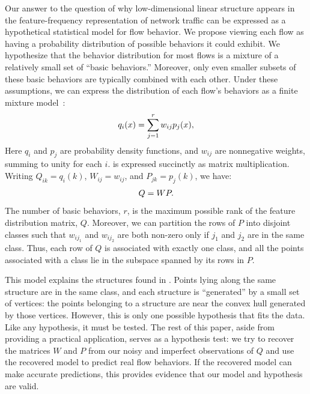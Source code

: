 \documentclass[conference]{IEEEtran}
\begin{document}
Our answer to the question of why low-dimensional linear structure appears in the feature-frequency representation of network traffic can be expressed as a hypothetical statistical model for flow behavior.
We propose viewing each flow as having a probability distribution of possible behaviors it could exhibit.
We hypothesize that the behavior distribution for most flows is a mixture of a relatively small set of ``basic behaviors.''
Moreover, only even smaller subsets of these basic behaviors are typically combined with each other.
Under these assumptions, we can express the distribution of each flow's behaviors as a finite mixture model~\cite{McLachlan00}:
\begin{align}\eqn{mixture-model}
  q_i(x) = \sum_{j=1}^r w_{ij} p_j(x),
\end{align}
Here $q_i$ and $p_j$ are probability density functions, and $w_{ij}$ are nonnegative weights, summing to unity for each $i$.
 is expressed succinctly as matrix multiplication.
Writing $Q_{ik} = q_i(k)$, $W_{ij} = w_{ij}$, and $P_{jk} = p_j(k)$, we have:
\begin{align}\eqn{mixture-model-matrix}
  Q = WP.
\end{align}
The number of basic behaviors, $r$, is the maximum possible rank of the feature distribution matrix, $Q$.
Moreover, we can partition the rows of $P$ into disjoint classes such that $w_{ij_1}$ and $w_{ij_2}$ are both non-zero only if $j_1$ and $j_2$ are in the same class.
Thus, each row of $Q$ is associated with exactly one class, and all the points associated with a class lie in the subspace spanned by its rows in $P$.

This model explains the structures found in .
Points lying along the same structure are in the same class, and each structure is ``generated'' by a small set of vertices:
the points belonging to a structure are near the convex hull generated by those vertices.
However, this is only one possible hypothesis that fits the data.
Like any hypothesis, it must be tested.
The rest of this paper, aside from providing a practical application, serves as a hypothesis test:
we try to recover the matrices $W$ and $P$ from our noisy and imperfect observations of $Q$ and use the recovered model to predict real flow behaviors.
If the recovered model can make accurate predictions, this provides evidence that our model and hypothesis are valid.
\end{document}
